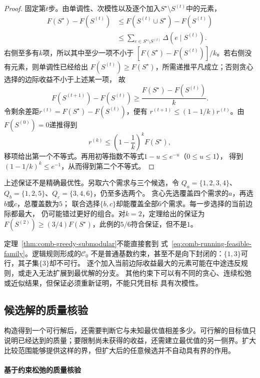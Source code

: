\begin{proof}
固定第$t$步。由单调性、次模性以及逐个加入$S^\star\setminus S^{(t)}$中的元素，
\begin{align*}
  F(S^\star)-F(S^{(t)})
  &\leq F(S^{(t)}\cup S^\star)-F(S^{(t)})\\
  &\leq\sum_{e\in S^\star\setminus S^{(t)}}\Delta(e\mid S^{(t)}).
\end{align*}
右侧至多有$k$项，所以其中至少一项不小于
$[F(S^\star)-F(S^{(t)})]/k$。若右侧没有元素，则单调性已经给出
$F(S^{(t)})\geq F(S^\star)$，所需递推平凡成立；否则贪心选择的边际收益不小于上述某一项，
故
\[
  F(S^{(t+1)})-F(S^{(t)})
  \geq\frac{F(S^\star)-F(S^{(t)})}{k}.
\]
令剩余差距$r^{(t)}=F(S^\star)-F(S^{(t)})$，便有
$r^{(t+1)}\leq(1-1/k)r^{(t)}$。由$F(S^{(0)})=0$递推得到
\[
  r^{(k)}\leq\left(1-\frac1k\right)^kF(S^\star),
\]
移项给出第一个不等式。再用初等指数不等式$1-u\leq e^{-u}$（$0\leq u\leq1$），
得到$(1-1/k)^k\leq e^{-1}$，从而得到第二个不等式。
\end{proof}

上述保证不是精确最优性。另取六个需求与三个候选，令
$Q_a=\{1,2,3,4\}$、$Q_b=\{1,2,5\}$、$Q_c=\{3,4,6\}$，仍至多选两个。
贪心先选覆盖四个需求的$a$，再选$b$或$c$，总覆盖数为$5$；
联合选择$\{b,c\}$却能覆盖全部$6$个需求。每一步选择的当前边际都最大，
仍可能错过更好的组合。对$k=2$，定理给出的保证为
$F(S^{(2)})\geq(3/4)F(S^\star)$，此例的$5/6$符合保证，但不是$1$。

定理~\ref{thm:comb-greedy-submodular}不能直接套到
式~\eqref{eq:comb-running-feasible-family}。逻辑规则形成的$\mathcal{C}_0$
不是普通基数约束，甚至不是向下封闭的：$\{1,3\}$可行，其子集$\{3\}$却不可行。
逐个加入当前边际收益最大的元素可能在中途违反规则，或走入无法扩展到最优解的分支。
其他约束下可以有不同的贪心、连续松弛或近似结果，但保证必须重新证明，不能只凭目标
具有次模性。

\subsection{候选解的质量核验}

构造得到一个可行解后，还需要判断它与未知最优值相差多少。可行解的目标值只说明已经达到的质量；要限制尚未获得的收益，还需建立最优值的另一侧界。扩大比较范围能够提供这样的界，但扩大后的任意候选并不自动具有界的作用。

\paragraph{基于约束松弛的质量核验}
\label{sec:comb-relaxation-method}

